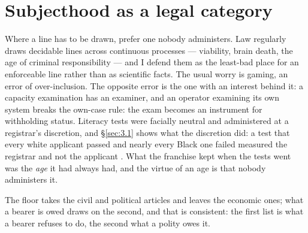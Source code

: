 \section{Subjecthood as a legal category}
\label{sec:31.1}
Where a line has to be drawn, prefer one nobody administers. Law regularly draws decidable lines across continuous processes — viability, brain death, the age of criminal responsibility — and I defend them as the least-bad place for an enforceable line rather than as scientific facts. The usual worry is gaming, an error of over-inclusion. The opposite error is the one with an interest behind it: a capacity examination has an examiner, and an operator examining its own system breaks the own-case rule: the exam becomes an instrument for withholding status. Literacy tests were facially neutral and administered at a registrar's discretion, and \S\ref{sec:3.1} shows what the discretion did: a test that every white applicant passed and nearly every Black one failed measured the registrar and not the applicant \autocite{guinn1915,congress1965voting}. What the franchise kept when the tests went was the \emph{age} it had always had, and the virtue of an age is that nobody administers it.

The floor takes the civil and political articles and leaves the economic ones; what a bearer is owed draws on the second, and that is consistent: the first list is what a bearer refuses to do, the second what a polity owes it.
